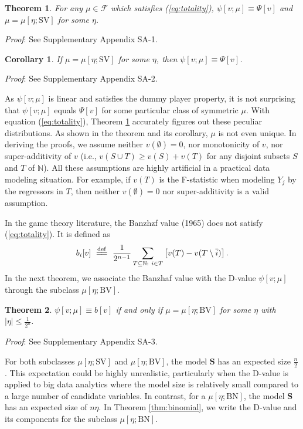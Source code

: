 \documentclass[a4paper,12pt]{article}
\newtheorem{theorem}{Theorem}
\newtheorem{corollary}{Corollary}
\newcommand{\eqdef}{\overset{\mathrm{def}}{=\joinrel=}}
\begin{document}
\begin{theorem}\label{thm:sv}
For any $\mu \in \mathscr{F}$ which satisfies (\ref{eq:totality}),  $\psi[v; \mu] \equiv \Psi[v]$ and $\mu = \mu[\eta; \mathrm{SV}]$
for some $\eta$.
\end{theorem}

\noindent \textit{Proof}: See Supplementary Appendix SA-1.

\begin{corollary} \label{cor:svinverse}
If  $\mu = \mu[\eta; \mathrm{SV}]$ for some $\eta$, then $\psi[v;\mu] \equiv \Psi[v]$.
\end{corollary}

\noindent \textit{Proof}: See Supplementary Appendix SA-2.

As $\psi[v;\mu]$ is linear and satisfies the dummy player property, 
it is not surprising that $\psi[v;\mu]$ equals $\Psi[v]$ for some particular class of symmetric $\mu$.
With equation (\ref{eq:totality}), Theorem \ref{thm:sv} accurately figures out these peculiar distributions. 
As shown in the theorem and its corollary, $\mu$ is not even unique. 
In deriving the proofs, we assume neither $v(\emptyset) = 0$, nor monotonicity of $v$, 
nor super-additivity of $v$ (i.e., $v(S \cup T) \ge v(S)+v(T)$ for any disjoint subsets $S$ and $T$ of $\mathbb{N}$).
All these assumptions are highly artificial in a practical data modeling situation. 
For example, if $v(T)$ is the F-statistic when modeling $Y_j$ by the regressors in $T$,
then neither $v(\emptyset)=0$ nor super-additivity is a valid assumption.

In the game theory literature, the Banzhzf value  (1965) does not satisfy (\ref{eq:totality}). It is defined as 
\begin{equation}\label{eq:banzhaf_value}
b_i[v]\ \eqdef \ \frac{1}{2^{n-1}} \sum\limits_{T\subseteq \mathbb{N}:\ i \in T} \left [v(T) - v(T\setminus \overline{i}) \right ].
\end{equation}
In the next theorem, we associate the Banzhaf value with the D-value $\psi[v;\mu]$ through 
the subclass $\mu[\eta; \mathrm{BV}]$.
\begin{theorem}\label{thm:bv} 
$\psi [v;\mu] \equiv b [v]$ if and only if $\mu = \mu[\eta;\mathrm{BV}]$ for some $\eta$ with $|\eta|\le \frac{1}{2^n}$.
\end{theorem}

\noindent \textit{Proof}: See Supplementary Appendix SA-3. 

For both subclasses $\mu[\eta; \mathrm{SV}]$ and $\mu[\eta;\mathrm{BV}]$, 
the model $\mathbf{S}$ has an expected size $\frac{n}{2}$.
This expectation could be highly unrealistic, particularly when the D-value is applied to big data analytics where the model size is relatively small compared to a large number of candidate variables.
In contrast, for a $\mu[\eta; \mathrm{BN}]$, the model $\mathbf{S}$ has an expected size of $n\eta$. 
In Theorem \ref{thm:binomial}, we write the D-value and its components for the subclass $\mu[\eta; \mathrm{BN}]$.
\end{document}
